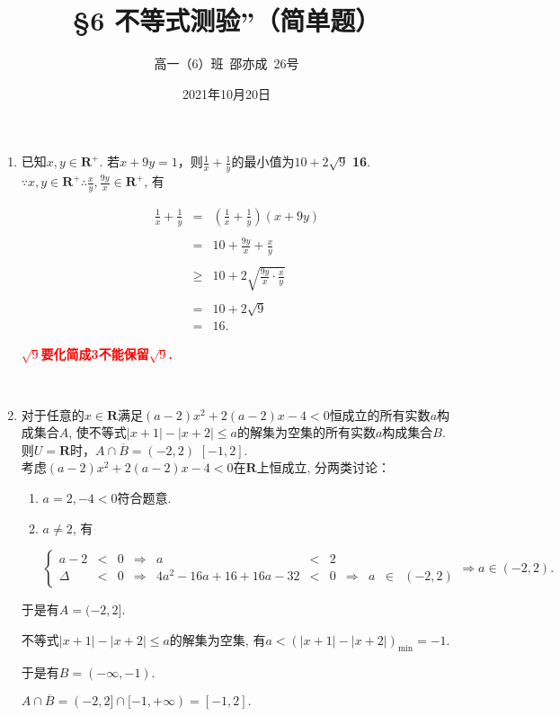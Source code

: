 \documentclass[8pt]{article}
\author{高一（6）班\ 邵亦成\ 26号}
\title{\S 6 不等式测验''（简单题）}
\date{2021年10月20日}
\begin{document}
	\maketitle

	\begin{enumerate}[label=(\arabic*)]
		\item 已知$x, y\in\mathbf{R}^{+}.$ 若$x+9y=1$，则$\displaystyle \frac{1}{x}+\frac{1}{y}$的最小值为\st{$10+2\sqrt{9}$} \textbf{16}.
			~\\

			$\displaystyle \because x,y \in \mathbf{R}^{+} \therefore \frac{x}{y}, \frac{9y}{x} \in \mathbf{R}^{+}$, 有

			$$
			\begin{array}{rcl}
				\displaystyle \frac{1}{x}+\frac{1}{y}&=&\displaystyle \left(\frac{1}{x}+\frac{1}{y}\right)(x+9y)\\\\
				&=&\displaystyle 10+\frac{9y}{x}+\frac{x}{y}\\\\
				&\geq&\displaystyle 10+2\sqrt{\frac{9y}{x}\cdot\frac{x}{y}}\\\\
				&=&\displaystyle 10+2\sqrt{9}\\
				&=&\displaystyle 16.
			\end{array}
			$$

			\textcolor{red}{\textbf{$\sqrt{9}$要化简成3不能保留$\sqrt{9}$.}}

		~\\

		\item 对于任意的$x\in\mathbf{R}$满足$(a-2)x^2+2(a-2)x-4<0$恒成立的所有实数$a$构成集合$A$, 使不等式$|x+1|-|x+2|\leq a$的解集为空集的所有实数$a$构成集合$B$. 则$U=\mathbf{R}$时，$A\cap\overline{B}=$\st{$(-2, 2)$} \textbf{$[-1, 2]$}.
			~\\

			考虑$(a-2)x^2+2(a-2)x-4<0$在$\mathbf{R}$上恒成立, 分两类讨论：

			\begin{enumerate}[label=$\arabic*^{\circ}$]
				\item $a=2, -4<0$符合题意.
				\item $a\neq 2$, 有
				
					$$
					\left\{
					\begin{array}{rclcrclcrcl}
					a-2&<&0&\Rightarrow&a&<&2\\
					\Delta&<&0&\Rightarrow&4a^2-16a+16+16a-32&<&0&\Rightarrow&a&\in&(-2, 2)
					\end{array}
					\right.\Rightarrow a\in(-2, 2).
					$$
			\end{enumerate}

			于是有$A=(-2, 2].$

			不等式$|x+1|-|x+2|\leq a$的解集为空集, 有$a<(|x+1|-|x+2|)_{\min}=-1$.

			于是有$B=(-\infty, -1).$

			$A\cap \overline{B}=(-2, 2]\cap [-1, +\infty)=[-1, 2].$

	\end{enumerate}
\end{document}
